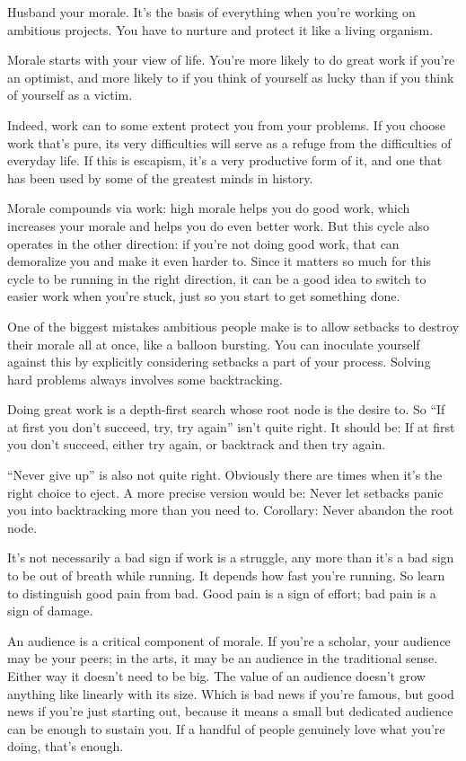 \documentclass[12pt]{book}
\begin{document}
Husband your morale. It's the basis of everything when you're working on
ambitious projects. You have to nurture and protect it like a living
organism.

Morale starts with your view of life. You're more likely to do great
work if you're an optimist, and more likely to if you think of yourself
as lucky than if you think of yourself as a victim.

Indeed, work can to some extent protect you from your problems. If you
choose work that's pure, its very difficulties will serve as a refuge
from the difficulties of everyday life. If this is escapism, it's a very
productive form of it, and one that has been used by some of the
greatest minds in history.

Morale compounds via work: high morale helps you do good work, which
increases your morale and helps you do even better work. But this cycle
also operates in the other direction: if you're not doing good work,
that can demoralize you and make it even harder to. Since it matters so
much for this cycle to be running in the right direction, it can be a
good idea to switch to easier work when you're stuck, just so you start
to get something done.

One of the biggest mistakes ambitious people make is to allow setbacks
to destroy their morale all at once, like a balloon bursting. You can
inoculate yourself against this by explicitly considering setbacks a
part of your process. Solving hard problems always involves some
backtracking.

Doing great work is a depth-first search whose root node is the desire
to. So ``If at first you don't succeed, try, try again'' isn't quite
right. It should be: If at first you don't succeed, either try again, or
backtrack and then try again.

``Never give up'' is also not quite right. Obviously there are times
when it's the right choice to eject. A more precise version would be:
Never let setbacks panic you into backtracking more than you need to.
Corollary: Never abandon the root node.

It's not necessarily a bad sign if work is a struggle, any more than
it's a bad sign to be out of breath while running. It depends how fast
you're running. So learn to distinguish good pain from bad. Good pain is
a sign of effort; bad pain is a sign of damage.

An audience is a critical component of morale. If you're a scholar, your
audience may be your peers; in the arts, it may be an audience in the
traditional sense. Either way it doesn't need to be big. The value of an
audience doesn't grow anything like linearly with its size. Which is bad
news if you're famous, but good news if you're just starting out,
because it means a small but dedicated audience can be enough to sustain
you. If a handful of people genuinely love what you're doing, that's
enough.
\end{document}
